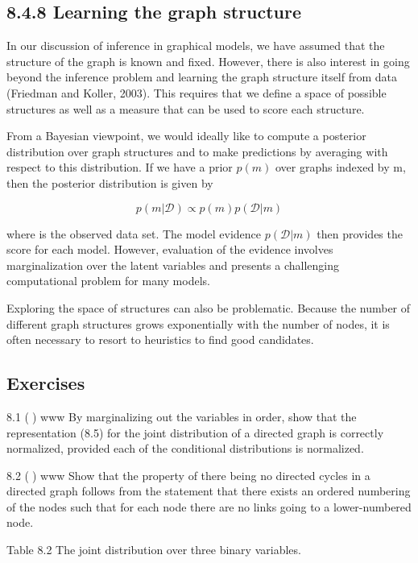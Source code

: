 \documentclass[
  10
]{article}
\begin{document}
\subsection{8.4.8 Learning the graph
structure}\label{learning-the-graph-structure}

In our discussion of inference in graphical models, we have assumed that
the structure of the graph is known and fixed. However, there is also
interest in going beyond the inference problem and learning the graph
structure itself from data (Friedman and Koller, 2003). This requires
that we define a space of possible structures as well as a measure that
can be used to score each structure.

From a Bayesian viewpoint, we would ideally like to compute a posterior
distribution over graph structures and to make predictions by averaging
with respect to this distribution. If we have a prior \(p ( m )\) over
graphs indexed by m, then the posterior distribution is given by

\[
p (m | \mathcal {D}) \propto p (m) p (\mathcal {D} | m)\tag{8.103}
\]

where is the observed data set. The model evidence
\(p ( \mathcal { D } | m )\) then provides the score for each model.
However, evaluation of the evidence involves marginalization over the
latent variables and presents a challenging computational problem for
many models.

Exploring the space of structures can also be problematic. Because the
number of different graph structures grows exponentially with the number
of nodes, it is often necessary to resort to heuristics to find good
candidates.

\subsection{Exercises}\label{exercises}

8.1 () www By marginalizing out the variables in order, show that the
representation (8.5) for the joint distribution of a directed graph is
correctly normalized, provided each of the conditional distributions is
normalized.

8.2 () www Show that the property of there being no directed cycles in a
directed graph follows from the statement that there exists an ordered
numbering of the nodes such that for each node there are no links going
to a lower-numbered node.

Table 8.2 The joint distribution over three binary variables.
\end{document}
